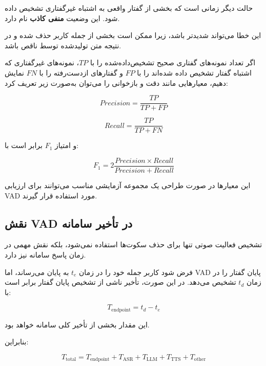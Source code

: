 حالت دیگر زمانی است که بخشی از گفتار واقعی به اشتباه
غیرگفتاری تشخیص داده شود.
این وضعیت
\textbf{منفی کاذب}
نام دارد.

این خطا می‌تواند شدیدتر باشد، زیرا ممکن است بخشی از جمله
کاربر حذف شده و در نتیجه متن تولیدشده توسط  ناقص باشد.

اگر تعداد نمونه‌های گفتاری صحیح تشخیص‌داده‌شده را با $TP$،
نمونه‌های غیرگفتاری که اشتباه گفتار تشخیص داده شده‌اند را با
$FP$ و گفتارهای ازدست‌رفته را با $FN$ نمایش دهیم، معیارهایی
مانند دقت و بازخوانی را می‌توان به‌صورت زیر تعریف کرد:

\begin{equation}
Precision
=
\frac{TP}{TP+FP}
\end{equation}

\begin{equation}
Recall
=
\frac{TP}{TP+FN}
\end{equation}

و امتیاز $F_1$ برابر است با:

\begin{equation}
F_1
=
2
\frac{Precision \times Recall}
     {Precision + Recall}
\end{equation}

این معیارها در صورت طراحی یک مجموعه آزمایشی مناسب می‌توانند
برای ارزیابی VAD مورد استفاده قرار گیرند.


\subsection{نقش VAD در تأخیر سامانه}

تشخیص فعالیت صوتی تنها برای حذف سکوت‌ها استفاده نمی‌شود،
بلکه نقش مهمی در زمان پاسخ سامانه نیز دارد.

فرض شود کاربر جمله خود را در زمان $t_e$ به پایان می‌رساند،
اما VAD پایان گفتار را در زمان $t_d$ تشخیص می‌دهد.
در این صورت، تأخیر ناشی از تشخیص پایان گفتار برابر است با:

\begin{equation}
T_{\mathrm{endpoint}}
=
t_d - t_e
\end{equation}

این مقدار بخشی از تأخیر کلی سامانه خواهد بود.

بنابراین:

\begin{equation}
T_{\mathrm{total}}
=
T_{\mathrm{endpoint}}
+
T_{\mathrm{ASR}}
+
T_{\mathrm{LLM}}
+
T_{\mathrm{TTS}}
+
T_{\mathrm{other}}
\end{equation}

